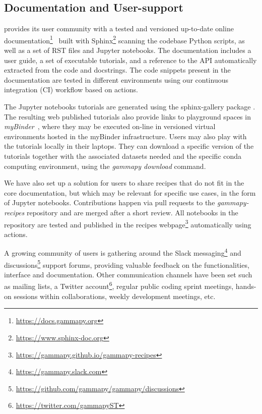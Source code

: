 \documentclass[longauth]{aa}
\begin{document}
\subsection{Documentation and User-support}
\label{ssec:documentation-and-user-support}
\gammapy provides its user community with a tested and versioned up-to-date
online
documentation\footnote{\url{https://docs.gammapy.org}}~\citep{2019ASPC..523..357B}
built with Sphinx\footnote{\url{https://www.sphinx-doc.org}} scanning the
codebase Python scripts, as well as a set of RST files and Jupyter notebooks.
The documentation includes a user guide, a set of executable
tutorials, and a reference to the API automatically extracted from the code and
docstrings. The \gammapy code snippets present in the documentation are tested
in different environments using our continuous integration (CI) workflow based
on \github actions.

The Jupyter notebooks tutorials are generated using the sphinx-gallery
package \citep{sphinx-gallery}.
The resulting web published tutorials also provide links to playground spaces in
\textit{myBinder}~\citep{project_jupyter-proc-scipy-2018}, where they may be executed
on-line in versioned virtual environments hosted in the myBinder
infrastructure. Users may also play with the tutorials locally in their
laptops. They can download a specific version of the tutorials together with
the associated datasets needed and the specific conda computing environment,
using the \textit{gammapy download} command.

We have also set up a solution for users to share recipes
that do not fit in the \gammapy core documentation, but which may be relevant for
specific use cases, in the form of Jupyter notebooks. Contributions happen via pull requests to the
\textit{gammapy-recipes} \github repository and are merged after a short review. All
notebooks in the repository are tested and published in the \gammapy recipes
webpage\footnote{\url{https://gammapy.github.io/gammapy-recipes}} automatically
using \github actions.

A growing community of users is gathering around the Slack
messaging\footnote{\url{https://gammapy.slack.com}} and \github
discussions\footnote{\url{https://github.com/gammapy/gammapy/discussions}}
support forums, providing valuable feedback on the \gammapy functionalities,
interface and documentation. Other communication channels have been set such as
mailing lists, a Twitter account\footnote{\url{https://twitter.com/gammapyST}},
regular public coding sprint meetings, hands-on sessions within collaborations,
weekly development meetings, etc.
\end{document}
